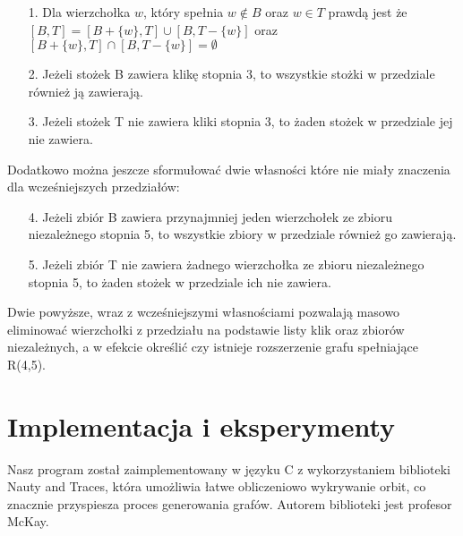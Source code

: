 \documentclass[11pt]{article}
\begin{document}
\begin{enumerate}
  \item[1.] Dla wierzchołka $w$, który spełnia $w \notin B$ oraz $w\in T$ prawdą jest że $[B, T] = [B + \{ w\}, T] \cup [B , T - \{ w\}]$ oraz $[B +\{ w\}, T] \cap [B , T - \{ w\}] = \emptyset$
  
  \item[2.] Jeżeli stożek B zawiera klikę stopnia 3, to wszystkie stożki w przedziale również ją zawierają. 
  
  \item[3.] Jeżeli stożek T nie zawiera kliki stopnia 3, to żaden stożek w przedziale jej nie zawiera.
\end{enumerate}
Dodatkowo można jeszcze sformułować dwie własności które nie miały znaczenia dla wcześniejszych przedziałów:
\begin{enumerate}
\item[4.] Jeżeli zbiór B zawiera przynajmniej jeden wierzchołek ze zbioru niezależnego stopnia 5, to wszystkie zbiory w przedziale również go zawierają. 

\item[5.] Jeżeli zbiór T nie zawiera żadnego wierzchołka ze zbioru niezależnego stopnia 5, to żaden stożek w przedziale ich nie zawiera.
\end {enumerate}
Dwie powyższe, wraz z wcześniejszymi własnościami pozwalają masowo eliminować wierzchołki z przedziału na podstawie listy klik oraz zbiorów niezależnych, a w efekcie określić czy istnieje rozszerzenie grafu spełniające R(4,5).

\section{Implementacja i eksperymenty}
Nasz program został zaimplementowany w języku C z wykorzystaniem biblioteki Nauty and Traces\cite{nauty}, która umożliwia łatwe obliczeniowo wykrywanie orbit, co znacznie przyspiesza proces generowania grafów. 
Autorem biblioteki jest profesor McKay. 
\end{document}

